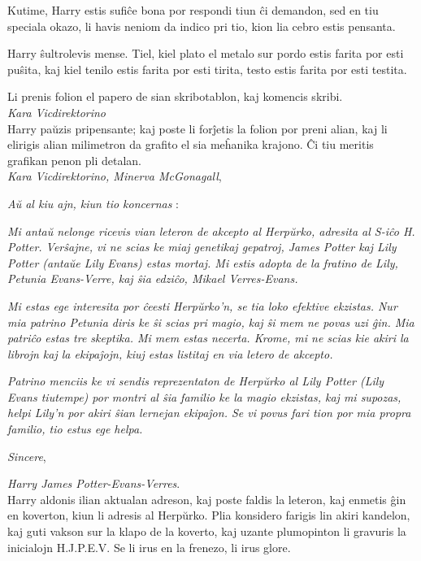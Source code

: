 Kutime, Harry estis sufiĉe bona por respondi tiun ĉi demandon, sed en
tiu speciala okazo, li havis neniom da indico pri tio, kion lia cebro
estis pensanta.

Harry ŝultrolevis mense. Tiel, kiel plato el metalo sur pordo
estis farita por esti puŝita, kaj kiel tenilo estis farita por esti
tirita, testo estis farita por esti testita.

Li prenis folion el papero de sian skribotablon, kaj komencis skribi. \\

\emph{Kara Vicdirektorino} \\

Harry paŭzis pripensante; kaj poste li forĵetis la folion por preni
alian, kaj li elirigis alian milimetron da grafito el sia meĥanika
krajono. Ĉi tiu meritis grafikan penon pli detalan. \\

\emph{Kara Vicdirektorino, Minerva McGonagall},

\emph{Aŭ al kiu ajn, kiun tio koncernas} : 

\emph{Mi antaŭ nelonge ricevis vian leteron de akcepto al Herpŭrko,
adresita al S-iĉo H. Potter. Verŝajne, vi ne scias ke miaj genetikaj
gepatroj, James Potter kaj Lily Potter (antaŭe Lily Evans) estas
mortaj.  Mi estis adopta de la fratino de Lily, Petunia Evans-Verre,
kaj ŝia edziĉo, Mikael Verres-Evans.}

\emph{Mi estas ege interesita por ĉeesti Herpŭrko'n, se tia loko
efektive ekzistas. Nur mia patrino Petunia diris ke ŝi scias pri
magio, kaj ŝi mem ne povas uzi ĝin. Mia patriĉo estas tre skeptika. Mi
mem estas necerta. Krome, mi ne scias kie akiri la librojn kaj la
ekipaĵojn, kiuj estas listitaj en via letero de akcepto.}

\emph{Patrino menciis ke vi sendis reprezentaton de Herpŭrko al Lily
Potter (Lily Evans tiutempe) por montri al ŝia familio ke la magio
ekzistas, kaj mi supozas, helpi Lily'n por akiri ŝian lernejan
ekipaĵon. Se vi povus fari tion por mia propra familio, tio estus ege
helpa.}

\emph{Sincere},

\emph{Harry James Potter-Evans-Verres}.\\


Harry aldonis ilian aktualan adreson, kaj poste faldis la leteron, kaj
enmetis ĝin en koverton, kiun li adresis al Herpŭrko. Plia konsidero
farigis lin akiri kandelon, kaj guti vakson sur la klapo de la
koverto, kaj uzante plumopinton li gravuris la inicialojn
H.J.P.E.V. Se li irus en la frenezo, li irus glore.

